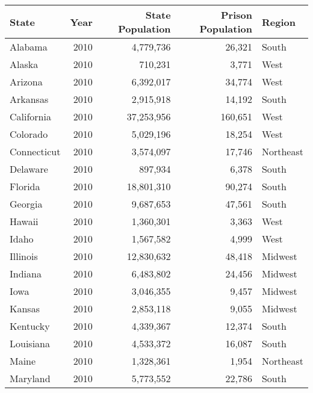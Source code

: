 \documentclass{exam}
\begin{document}
    \centering
    \begin{tabular}{lrrrl}
      \toprule
      State          & Year & State Population & Prison Population & Region \\
      \midrule
      Alabama        & 2010 & 4,779,736        & 26,321            & South \\
      Alaska         & 2010 & 710,231          & 3,771             & West \\
      Arizona        & 2010 & 6,392,017        & 34,774            & West \\
      Arkansas       & 2010 & 2,915,918        & 14,192            & South \\
      California     & 2010 & 37,253,956       & 160,651           & West \\
      Colorado       & 2010 & 5,029,196        & 18,254            & West \\
      Connecticut    & 2010 & 3,574,097        & 17,746            & Northeast \\
      Delaware       & 2010 & 897,934          & 6,378             & South \\
      Florida        & 2010 & 18,801,310       & 90,274            & South \\
      Georgia        & 2010 & 9,687,653        & 47,561            & South \\
      Hawaii         & 2010 & 1,360,301        & 3,363             & West \\
      Idaho          & 2010 & 1,567,582        & 4,999             & West \\
      Illinois       & 2010 & 12,830,632       & 48,418            & Midwest \\
      Indiana        & 2010 & 6,483,802        & 24,456            & Midwest \\
      Iowa           & 2010 & 3,046,355        & 9,457             & Midwest \\
      Kansas         & 2010 & 2,853,118        & 9,055             & Midwest \\
      Kentucky       & 2010 & 4,339,367        & 12,374            & South \\
      Louisiana      & 2010 & 4,533,372        & 16,087            & South \\
      Maine          & 2010 & 1,328,361        & 1,954             & Northeast \\
      Maryland       & 2010 & 5,773,552        & 22,786            & South \\

\end{tabular}
\end{document}
